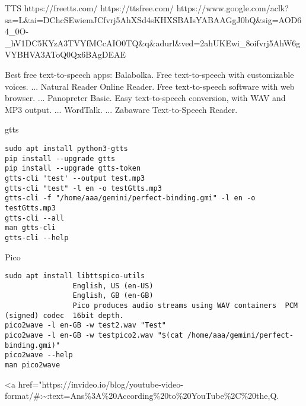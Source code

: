 \documentclass[
]{article}
\begin{document}
TTS https://freetts.com/ https://ttsfree.com/
https://www.google.com/aclk?sa=L\&ai=DChcSEwiemJCfvrj5AhXSd4sKHXSBAIsYABAAGgJ0bQ\&sig=AOD64\_0O-\_hV1DC5KYzA3TVYfMCcAIO0TQ\&q\&adurl\&ved=2ahUKEwi\_8oifvrj5AhW6gVYBHVA3AToQ0Qx6BAgDEAE

Best free text-to-speech apps: Balabolka. Free text-to-speech with
customizable voices. ... Natural Reader Online Reader. Free
text-to-speech software with web browser. ... Panopreter Basic. Easy
text-to-speech conversion, with WAV and MP3 output. ... WordTalk. ...
Zabaware Text-to-Speech Reader.

gtts

\begin{verbatim}
sudo apt install python3-gtts
pip install --upgrade gtts
pip install --upgrade gtts-token
gtts-cli 'test' --output test.mp3
gtts-cli "test" -l en -o testGtts.mp3
gtts-cli -f "/home/aaa/gemini/perfect-binding.gmi" -l en -o testGtts.mp3
gtts-cli --all
man gtts-cli
gtts-cli --help
\end{verbatim}

Pico

\begin{verbatim}
sudo apt install libttspico-utils
                English, US (en-US)
                English, GB (en-GB)
                Pico produces audio streams using WAV containers  PCM (signed) codec  16bit depth.
pico2wave -l en-GB -w test2.wav "Test"
pico2wave -l en-GB -w testpico2.wav "$(cat /home/aaa/gemini/perfect-binding.gmi)"
pico2wave --help
man pico2wave
\end{verbatim}

\textless a
href="https://invideo.io/blog/youtube-video-format/\#:\textasciitilde:text=Ans\%3A\%20According\%20to\%20YouTube\%2C\%20the,Q.
\end{document}
